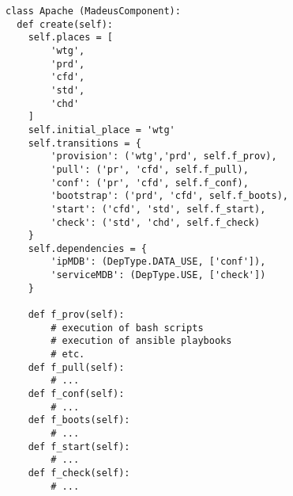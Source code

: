 \begin{lstlisting}[label=codeapache,caption=Madeus code of the Apache
  component type.]
class Apache (MadeusComponent):
  def create(self):
    self.places = [
        'wtg',
        'prd',
        'cfd',
        'std',
        'chd'
    ]
    self.initial_place = 'wtg'
    self.transitions = {
        'provision': ('wtg','prd', self.f_prov),
        'pull': ('pr', 'cfd', self.f_pull),
        'conf': ('pr', 'cfd', self.f_conf),
        'bootstrap': ('prd', 'cfd', self.f_boots),
        'start': ('cfd', 'std', self.f_start),
        'check': ('std', 'chd', self.f_check)
    }
    self.dependencies = {
        'ipMDB': (DepType.DATA_USE, ['conf']),
        'serviceMDB': (DepType.USE, ['check'])
    }

    def f_prov(self):
        # execution of bash scripts
        # execution of ansible playbooks
        # etc.
    def f_pull(self):
        # ...
    def f_conf(self):
        # ...
    def f_boots(self):
        # ...
    def f_start(self):
        # ...
    def f_check(self):
        # ...
\end{lstlisting}
